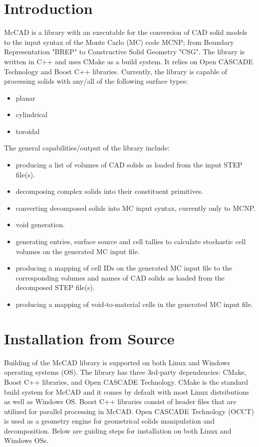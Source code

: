 \documentclass[12pt, a4paper, titlepage]{article}
\begin{document}
\section{Introduction} \label{sec:Introduction}
McCAD is a library with an executable for the conversion of CAD solid models to the input syntax of the Monte Carlo (MC) code MCNP; from Boundary Representation "BREP" to Constructive Solid Geometry "CSG". The library is written in C++ and uses CMake as a build system. It relies on Open CASCADE Technology and Boost C++ libraries. Currently, the library is capable of processing solids with any/all of the following surface types:
\begin{itemize}
	\item planar
	\item cylindrical
	\item toroidal
\end{itemize}
The general capabilities/output of the library include:
\begin{itemize}
	\item producing a list of volumes of CAD solids as loaded from the input STEP file(s).
	\item decomposing complex solids into their constituent primitives.
	\item converting decomposed solids into MC input syntax, currently only to MCNP.
	\item void generation.
	\item generating entries, surface source and cell tallies to calculate stochastic cell volumes on the generated MC input file.
	\item producing a mapping of cell IDs on the generated MC input file to the corresponding volumes and names of CAD solids as loaded from the decomposed STEP file(s).
	\item producing a mapping of void-to-material cells in the generated MC input file.
\end{itemize}

\section{Installation from Source} \label{sec:Installation from Source}
Building of the McCAD library is supported on both Linux and Windows operating systems (OS). The library has three 3rd-party dependencies: CMake, Boost C++ libraries, and Open CASCADE Technology. CMake is the standard build system for McCAD and it comes by default with most Linux distributions as well as Windows OS. Boost C++ libraries consist of header files that are utilized for parallel processing in McCAD. Open CASCADE Technology (OCCT) is used as a geometry engine for geometrical solids manipulation and decomposition. Below are guiding steps for installation on both Linux and Windows OSs. 
\end{document}
